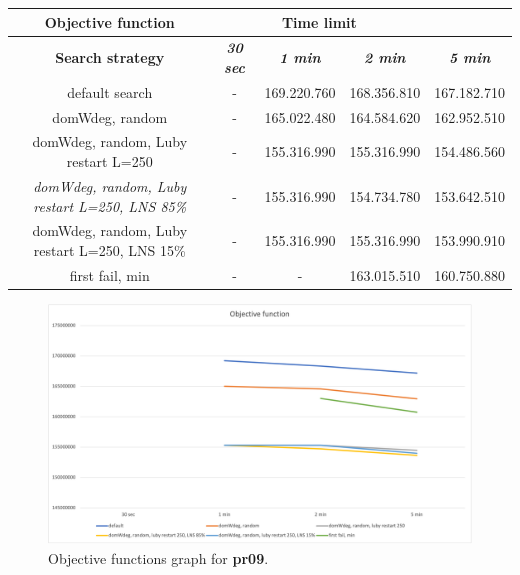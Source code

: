{
\renewcommand{\arraystretch}{2}
\begin{longtable}[h]{| c | c | c | c | c |}
    \hline
    \textbf{Objective function} & \multicolumn{3}{c}{Time limit} & \\
    \hline
    \textbf{Search strategy} & \textbf{\textit{30 sec}} & \textbf{\textit{1 min}} & \textbf{\textit{2 min}} & \textbf{\textit{5 min}} \\
    \hline
    \endhead
    default search                                         & - & 169.220.760 & 168.356.810 & 167.182.710 \\
    \hline
    domWdeg, random                                        & - & 165.022.480 & 164.584.620 & 162.952.510 \\
    \hline
    domWdeg, random, Luby restart L=250                    & - & 155.316.990 & 155.316.990 & 154.486.560 \\
    \hline
    \textit{domWdeg, random, Luby restart L=250, LNS 85\%} & - & 155.316.990 & 154.734.780 & 153.642.510 \\
    \hline
    domWdeg, random, Luby restart L=250, LNS 15\%          & - & 155.316.990 & 155.316.990 & 153.990.910 \\
    \hline
    first fail, min                                        & - &         - & 163.015.510 & 160.750.880 \\
    \hline
\end{longtable}
}
\begin{figure}[H]
    \centering
    \includegraphics[width=0.8\columnwidth]{../graphs/pr09-objf.png}
    \caption{Objective functions graph for \textbf{pr09}.}
\end{figure}

